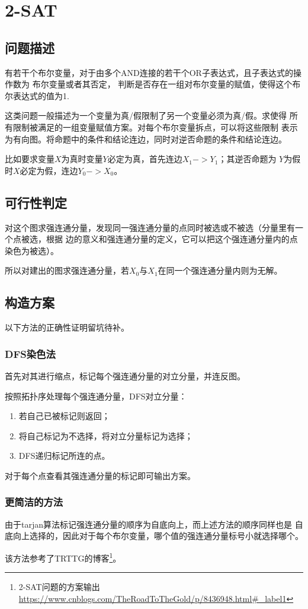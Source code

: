 \section{2-SAT}
\subsection{问题描述}
有若干个布尔变量，对于由多个AND连接的若干个OR子表达式，且子表达式的操作数为
布尔变量或者其否定，
判断是否存在一组对布尔变量的赋值，使得这个布尔表达式的值为1.

这类问题一般描述为一个变量为真/假限制了另一个变量必须为真/假。求使得
所有限制被满足的一组变量赋值方案。对每个布尔变量拆点，可以将这些限制
表示为有向图。将命题中的条件和结论连边，同时对逆否命题的条件和结论连边。

比如要求变量$X$为真时变量$Y$必定为真，首先连边$X_1->Y_1$；其逆否命题为
$Y$为假时$X$必定为假，连边$Y_0->X_0$。
\subsection{可行性判定}
对这个图求强连通分量，发现同一强连通分量的点同时被选或不被选（分量里有一个点被选，根据
边的意义和强连通分量的定义，它可以把这个强连通分量内的点染色为被选）。

所以对建出的图求强连通分量，若$X_0$与$X_1$在同一个强连通分量内则为无解。
\subsection{构造方案}
以下方法的正确性证明留坑待补。
\subsubsection{DFS染色法}
首先对其进行缩点，标记每个强连通分量的对立分量，并连反图。

按照拓扑序处理每个强连通分量，DFS对立分量：
\begin{enumerate}
    \item 若自己已被标记则返回；
    \item 将自己标记为不选择，将对立分量标记为选择；
    \item DFS递归标记所连的点。
\end{enumerate}
对于每个点查看其强连通分量的标记即可输出方案。
\subsubsection{更简洁的方法}
由于tarjan算法标记强连通分量的顺序为自底向上，而上述方法的顺序同样也是
自底向上选择的，因此对于每个布尔变量，哪个值的强连通分量标号小就选择哪个。

该方法参考了TRTTG的博客\footnote{2-SAT问题的方案输出
\url{https://www.cnblogs.com/TheRoadToTheGold/p/8436948.html\#\_label1}}。
